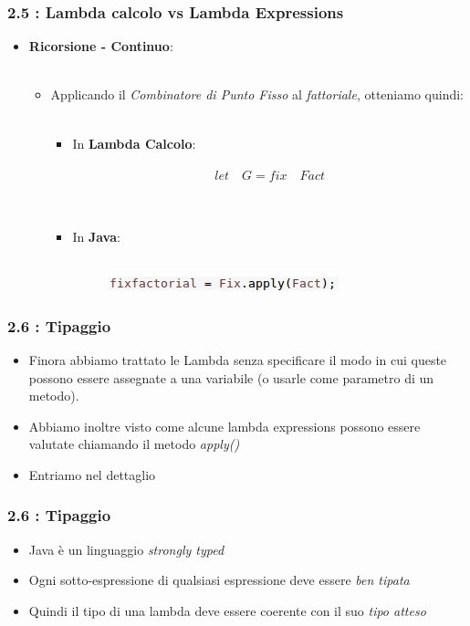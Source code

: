 \documentclass{beamer}
\begin{document}
\begin{frame}
	\frametitle{\textbf{2.5 : Lambda calcolo vs Lambda Expressions}}
	\begin{itemize}
		\item
			\textbf{Ricorsione - Continuo}:\\\
			\begin{itemize}
				\item 
					Applicando il \textit{Combinatore di Punto Fisso} al \textit{fattoriale}, otteniamo quindi:\\\
					\begin{itemize}
						\item 
							In \textbf{Lambda Calcolo}:\\\
								\[
									let \quad G = fix \quad Fact
								\]\\\
						\item 
							In \textbf{Java}:\\\
								\begin{figure}
									\centering
									\includegraphics[width=0.8\linewidth]{image/factok.png}
									\label{fig:identity}
								\end{figure}
					\end{itemize}
			\end{itemize}
	\end{itemize}
\end{frame}


\begin{frame}
\frametitle{\textbf{2.6 : Tipaggio}}
\begin{itemize}
	\item Finora abbiamo trattato le Lambda senza specificare il modo in cui queste possono essere assegnate a una variabile (o usarle come parametro di un metodo).
	\item Abbiamo inoltre visto come alcune lambda expressions possono essere valutate chiamando il metodo \emph{apply()}
	\item Entriamo nel dettaglio
\end{itemize}
\end{frame}


\begin{frame}
\frametitle{\textbf{2.6 : Tipaggio}}
\begin{itemize}
	\item Java \`e un linguaggio \emph{strongly typed}
	\item Ogni sotto-espressione di qualsiasi espressione deve essere \emph{ben tipata}
	\item Quindi il tipo di una lambda deve essere coerente con il suo \emph{tipo atteso}
\end{itemize}
\end{frame}
\end{document}
